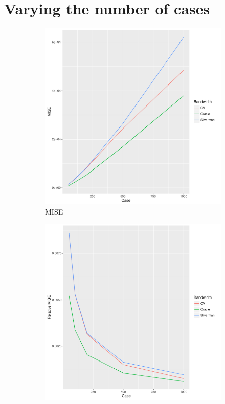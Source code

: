 \section{Varying the number of cases}
\label{sec:results:unif_NCases_1h}

\begin{figure}[htb]
    \centering
    \begin{subfigure}[b]{0.3\textwidth}
    \includegraphics[width=\textwidth]{results/by_num_cases/MISE-vs-cases}
    \caption{MISE}
    \end{subfigure}
    \begin{subfigure}[b]{0.3\textwidth}
    \includegraphics[width=\textwidth]{results/by_num_cases/RMISE-vs-cases}

\end{subfigure}
\end{figure}
